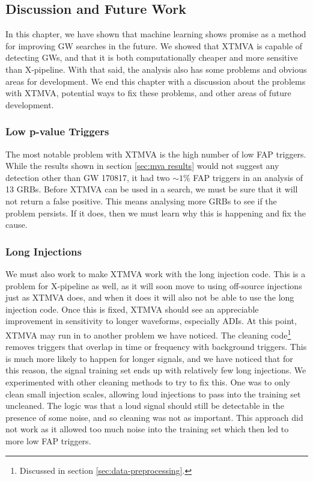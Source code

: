 \documentclass[11pt]{cuthesis}
\newcommand{\xp}{X-pipeline }
\begin{document}
\subsection{Discussion and Future Work} \label{sec:mva future}
In this chapter, we have shown that machine learning shows promise as a method for improving GW searches in the future. We showed that XTMVA is capable of detecting GWs, and that it is both computationally cheaper and more sensitive than X-pipeline. With that said, the analysis also has some problems and obvious areas for development. We end this chapter with a discussion about the problems with XTMVA, potential ways to fix these problems, and other areas of future development. 

\subsubsection{Low p-value Triggers}
The most notable problem with XTMVA is the high number of low FAP triggers. While the results shown in section \ref{sec:mva results} would not suggest any detection other than GW 170817, it had two $\sim1\%$ FAP triggers in an analysis of 13 GRBs. Before XTMVA can be used in a search, we must be sure that it will not return a false positive. This means analysing more GRBs to see if the problem persists. If it does, then we must learn why this is happening and fix the cause.

\subsubsection{Long Injections}
We must also work to make XTMVA work with the long injection code. This is a problem for \xp as well, as it will soon move to using off-source injections just as XTMVA does, and when it does it will also not be able to use the long injection code. Once this is fixed, XTMVA should see an appreciable improvement in sensitivity to longer waveforms, especially ADIs. At this point, XTMVA may run in to another problem we have noticed. The cleaning code\footnote{Discussed in section \ref{sec:data-preprocessing}.} removes triggers that overlap in time or frequency with background triggers. This is much more likely to happen for longer signals, and we have noticed that for this reason, the signal training set ends up with relatively few long injections. We experimented with other cleaning methods to try to fix this. One was to only clean small injection scales, allowing loud injections to pass into the training set uncleaned. The logic was that a loud signal should still be detectable in the presence of some noise, and so cleaning was not as important. This approach did not work as it allowed too much noise into the training set which then led to more low FAP triggers. 
\end{document}
